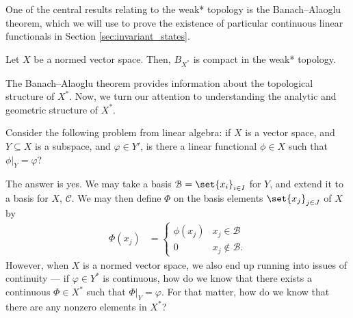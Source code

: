 \documentclass[10pt]{mypackage2}
\begin{document}
One of the central results relating to the weak* topology is the Banach--Alaoglu theorem, which we will use to prove the existence of particular continuous linear functionals in Section \ref{sec:invariant_states}.
\begin{theorem}\label{thm:banach_alaoglu}
  Let $X$ be a normed vector space. Then, $B_{X^{\ast}}$ is compact in the weak* topology.
\end{theorem}
The Banach--Alaoglu theorem provides information about the topological structure of $X^{\ast}$. Now, we turn our attention to understanding the analytic and geometric structure of $X^{\ast}$.\newline

Consider the following problem from linear algebra: if $X$ is a vector space, and $Y\subseteq X$ is a subspace, and $\varphi\in Y'$, is there a linear functional $\phi\in X$ such that $\phi|_{Y} = \varphi$?\newline

The answer is yes. We may take a basis $\mathcal{B} = \set{x_i}_{i\in I}$ for $Y$, and extend it to a basis for $X$, $\mathcal{C}$. We may then define $\Phi$ on the basis elements $\set{x_j}_{j\in J}$ of $X$ by
\begin{align*}
  \Phi\left( x_j \right) &= \begin{cases}
    \phi\left( x_j \right) & x_j\in \mathcal{B}\\
    0 & x_j\notin \mathcal{B}.
  \end{cases}
\end{align*}
However, when $X$ is a normed vector space, we also end up running into issues of continuity --- if $\varphi\in Y^{\ast}$ is continuous, how do we know that there exists a continuous $\Phi\in X^{\ast}$ such that $\Phi|_{Y} =\varphi$. For that matter, how do we know that there are any nonzero elements in $X^{\ast}$?\newline
\end{document}
